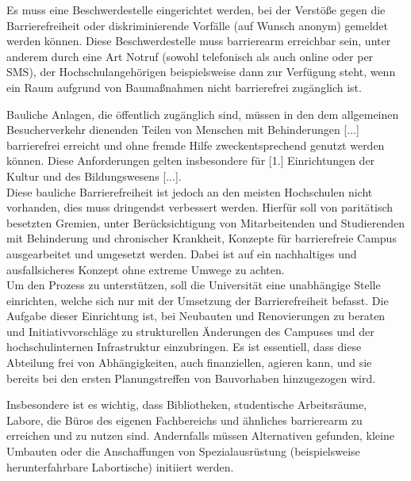 \documentclass[DIV=calc]{scrartcl}
\let\oldgrqq=\grqq
\def\grqq{\oldgrqq\xspace}
\begin{document}
Es muss eine Beschwerdestelle eingerichtet werden, bei der Verstöße gegen die Barrierefreiheit oder diskriminierende Vorfälle (auf Wunsch anonym) gemeldet werden können. Diese Beschwerdestelle muss barrierearm erreichbar sein, unter anderem durch eine Art Notruf (sowohl telefonisch als auch online oder per SMS), der Hochschulangehörigen beispielsweise dann zur Verfügung steht, wenn ein Raum aufgrund von Baumaßnahmen nicht barrierefrei zugänglich ist.


\glqq Bauliche Anlagen, die öffentlich zugänglich sind, müssen in den dem allgemeinen Besucherverkehr dienenden Teilen von Menschen mit Behinderungen [...] barrierefrei erreicht und ohne fremde Hilfe zweckentsprechend genutzt werden können. Diese Anforderungen gelten insbesondere für [1.] Einrichtungen der Kultur und des Bildungswesens [...].\\ 

Diese bauliche Barrierefreiheit ist jedoch an den meisten Hochschulen nicht vorhanden, dies muss dringendst verbessert werden. Hierfür soll von paritätisch besetzten Gremien, unter Berücksichtigung von Mitarbeitenden und Studierenden mit Behinderung und chronischer Krankheit, Konzepte für barrierefreie Campus ausgearbeitet und umgesetzt werden. Dabei ist auf ein nachhaltiges und ausfallsicheres Konzept ohne extreme Umwege  zu achten. \\
Um den Prozess zu unterstützen, soll die Universität eine unabhängige Stelle einrichten, welche sich nur mit der Umsetzung der Barrierefreiheit befasst. Die Aufgabe dieser Einrichtung ist, bei Neubauten und Renovierungen zu beraten und Initiativvorschläge zu strukturellen Änderungen des Campuses und der hochschulinternen Infrastruktur einzubringen. Es ist essentiell, dass diese Abteilung frei von Abhängigkeiten, auch finanziellen, agieren kann, und sie bereits bei den ersten Planungstreffen von Bauvorhaben hinzugezogen wird.

Insbesondere ist es wichtig, dass Bibliotheken, studentische Arbeitsräume, Labore, die Büros des eigenen Fachbereichs und ähnliches barrierearm zu erreichen und zu nutzen sind. Andernfalls müssen Alternativen gefunden, kleine Umbauten oder die Anschaffungen von Spezialausrüstung (beispielsweise herunterfahrbare Labortische) initiiert werden.
\end{document}
